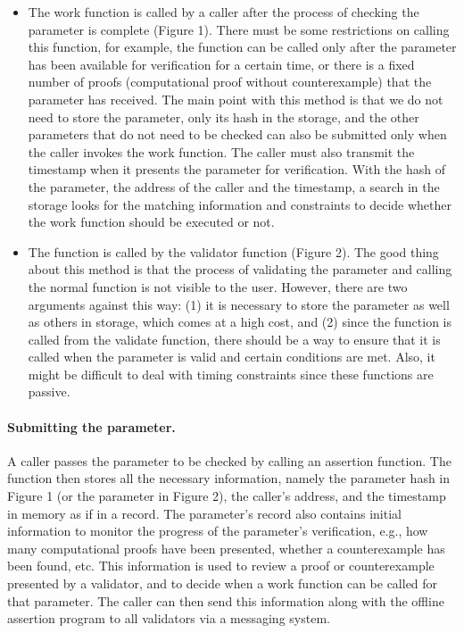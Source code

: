 \documentclass[runningheads]{llncs}
\begin{document}
\begin{itemize}
\item The work function is called by a caller after the process of checking the parameter is complete (Figure 1). There must be some restrictions on calling this function, for example, the function can be called only after the parameter has been available for verification for a certain time, or there is a fixed number of proofs (computational proof without counterexample) that the parameter has received. The main point with this method is that we do not need to store the parameter, only its hash in the storage, and the other parameters that do not need to be checked can also be submitted only when the caller invokes the work function. The caller must also transmit the timestamp when it presents the parameter for verification. With the hash of the parameter, the address of the caller and the timestamp, a search in the storage looks for the matching information and constraints to decide whether the work function should be executed or not.
\item The function is called by the validator function (Figure 2). The good thing about this method is that the process of validating the parameter and calling the normal function is not visible to the user. However, there are two arguments against this way: (1) it is necessary to store the parameter as well as others in storage, which comes at a high cost, and (2) since the function is called from the validate function, there should be a way to ensure that it is called when the parameter is valid and certain conditions are met. Also, it might be difficult to deal with timing constraints since these functions are passive. 
\end{itemize}

\paragraph{Submitting the parameter.} A caller passes the parameter to be checked by calling an assertion function. The function then stores all the necessary information, namely the parameter hash in Figure 1 (or the parameter in Figure 2), the caller's address, and the timestamp in memory as if in a record. The parameter's record also contains initial information to monitor the progress of the parameter's verification, e.g., how many computational proofs have been presented, whether a counterexample has been found, etc. This information is used to review a proof or counterexample presented by a validator, and to decide when a work function can be called for that parameter. The caller can then send this information along with the offline assertion program to all validators via a messaging system.
\end{document}
